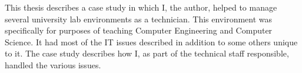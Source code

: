 



This thesis describes a case study in which I, the author, helped to manage several university lab environments as a technician.  This environment was specifically for purposes of teaching Computer Engineering and Computer Science.  It had most of the IT issues described in addition to some others unique to it.  The case study describes how I, as part of the technical staff responsible, handled the various issues.
